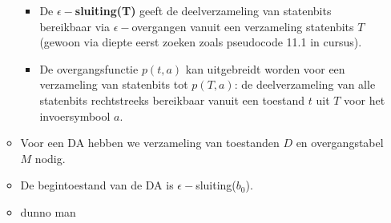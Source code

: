 \begin{itemize}
\begin{itemize}
\begin{itemize}
            \item De \textbf{$\epsilon-$sluiting(T)} geeft de deelverzameling van statenbits bereikbaar via $\epsilon-$overgangen vanuit een verzameling statenbits $T$ (gewoon via diepte eerst zoeken zoals pseudocode 11.1 in cursus).
            \item De overgangsfunctie $p(t, a)$ kan uitgebreidt worden voor een verzameling van statenbits tot $p(T, a)$: de deelverzameling van alle statenbits rechtstreeks bereikbaar vanuit een toestand $t$ uit $T$ voor het invoersymbool $a$.
        \end{itemize}
        \item Voor een DA hebben we verzameling van toestanden $D$ en overgangstabel $M$ nodig.
        \item De begintoestand van de DA is $\epsilon-$sluiting($b_0$).
        \item dunno man
    \end{itemize}
    
\end{itemize}

